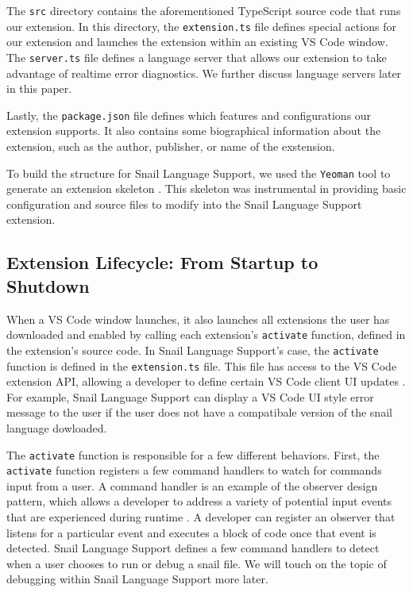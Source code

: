 \documentclass{article}
\begin{document}
The \lstinline{src} directory contains the aforementioned TypeScript source code that runs our extension. In this directory, the \lstinline{extension.ts} file defines special actions for our extension and launches the extension within an existing VS Code window. The \lstinline{server.ts} file defines a language server that allows our extension to take advantage of realtime error diagnostics. We further discuss language servers later in this paper. 

Lastly, the \lstinline{package.json} file defines which features and configurations our extension supports. It also contains some biographical information about the extension, such as the author, publisher, or name of the exstension. 

To build the structure for Snail Language Support, we used the \lstinline{Yeoman} tool to generate an extension skeleton \cite{Yeoman_2023}. This skeleton was instrumental in providing basic configuration and source files to modify into the Snail Language Support extension.

\subsection{Extension Lifecycle: From Startup to Shutdown}

When a VS Code window launches, it also launches all extensions the user has downloaded and enabled by calling each extension's \lstinline{activate} function, defined in the extension's source code. In Snail Language Support's case, the \lstinline{activate} function is defined in the \lstinline{extension.ts} file. This file has access to the VS Code extension API, allowing a developer to define certain VS Code client UI updates \cite{Microsoft_2023d}. For example, Snail Language Support can display a VS Code UI style error message to the user if the user does not have a compatibale version of the snail language dowloaded. 

The \lstinline{activate} function is responsible for a few different behaviors. First, the \lstinline{activate} function registers a few command handlers to watch for commands input from a user. A command handler is an example of the observer design pattern, which allows a developer to address a variety of potential input events that are experienced during runtime \cite{GangOfFour_1995}. A developer can register an observer that listens for a particular event and executes a block of code once that event is detected. Snail Language Support defines a few command handlers to detect when a user chooses to run or debug a snail file. We will touch on the topic of debugging within Snail Language Support more later. 
\end{document}
